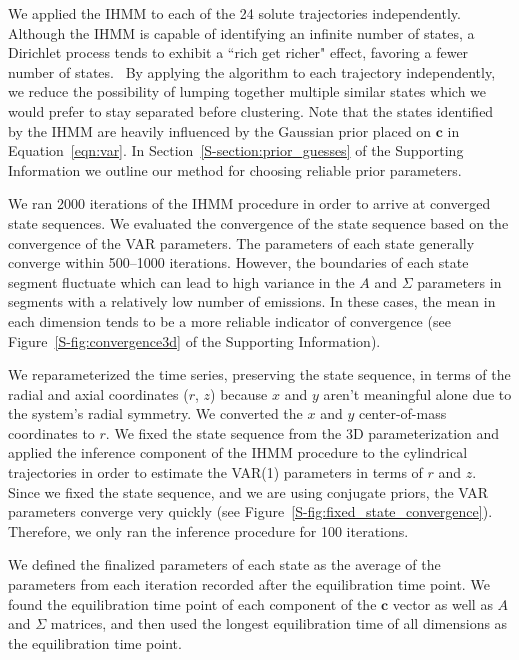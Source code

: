 \documentclass[journal=jpcbfk,manuscript=article]{achemso}
\begin{document}
  We applied the IHMM to each of the 24 solute trajectories independently.
  Although the IHMM is capable of identifying an infinite number of states, 
  a Dirichlet process tends to exhibit a ``rich get richer" effect, favoring
  a fewer number of states.~\cite{dreyer_discovering_2011} By applying the algorithm to each trajectory 
  independently, we reduce the possibility of lumping together multiple 
  similar states which we would prefer to stay separated before clustering.
  Note that the states identified by the IHMM are heavily influenced by 
  the Gaussian prior placed on $\mathbf{c}$ in Equation~\ref{eqn:var}. 
  In Section~\ref{S-section:prior_guesses} of the Supporting Information we 
  outline our method for choosing reliable prior parameters. 

  We ran 2000 iterations of the IHMM procedure in order to arrive at converged 
  state sequences. We evaluated the convergence of the state sequence based on
  the convergence of the VAR parameters. The parameters of each state
  generally converge within 500--1000 iterations. However, the boundaries of 
  each state segment fluctuate which can lead to high variance in the $A$
  and $\Sigma$ parameters in segments with a relatively low number of emissions.
  In these cases, the mean in each dimension tends to be a more reliable indicator of
  convergence (see Figure~\ref{S-fig:convergence3d} of the Supporting Information).
  
  We reparameterized the time series, preserving the state sequence, in terms
  of the radial and axial coordinates ($r$, $z$) because $x$ and $y$ aren't 
  meaningful alone due to the system's radial symmetry. We converted the $x$ and 
  $y$ center-of-mass coordinates to $r$. We fixed the state sequence from the 
  3D parameterization and applied the inference component of the IHMM procedure
  to the cylindrical trajectories in order to estimate the VAR(1) parameters in
  terms of $r$ and $z$. Since we fixed the state sequence, and we are using conjugate
  priors, the VAR parameters converge very quickly (see Figure~\ref{S-fig:fixed_state_convergence}).
  Therefore, we only ran the inference procedure for 100 iterations. 
  
  We defined the finalized parameters of each state as the average of the parameters 
  from each iteration recorded after the equilibration time point. We found the 
  equilibration time point of each component of the $\mathbf{c}$ vector as well as 
  $A$ and $\Sigma$ matrices, and then used the longest equilibration time of all 
  dimensions as the equilibration time point. 
  
\end{document}
